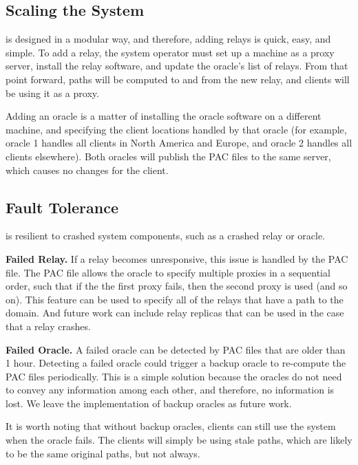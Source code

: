 \subsection{Scaling the System}
\system{} is 
designed in a modular way, and therefore, adding relays is quick, easy, and 
simple.  To add a relay, the system operator must set up a machine as a proxy 
server, install the \system{} relay software, and update the oracle's list of 
relays.  From that point forward, paths will be computed to and from the new 
relay, and clients will be using it as a proxy.  

Adding an oracle is a matter of installing the oracle software on 
a different machine, and specifying the client locations handled by that oracle 
(for example, oracle 1 handles all clients in North America and Europe, and 
oracle 2 handles all clients elsewhere).  Both oracles will publish the PAC files 
to the same server, which causes no changes for the client.

\subsection{Fault Tolerance}
\system{} is resilient to crashed system components, such as a crashed relay or 
oracle.  

{\bf Failed Relay.} If a relay becomes unresponsive, this issue is handled by 
the PAC file.  The PAC file allows the oracle to specify multiple proxies in 
a sequential order, such that if the the first proxy fails, then the second 
proxy is used (and so on).  This feature can be used to specify all of the 
relays that have a path to the domain.  And future work can include relay 
replicas that can be used in the case that a relay crashes.

{\bf Failed Oracle.} A failed oracle can be detected by PAC files that are 
older than 1 hour.  Detecting a failed oracle could trigger a backup oracle 
to re-compute the PAC files periodically.  This is a simple solution because 
the oracles do not need to convey any information among each other, and therefore, 
no information is lost.  We leave the implementation of backup oracles as future 
work.

It is worth noting that without backup oracles, clients can still use the system 
when the oracle fails.  The clients will simply be using stale paths, which are 
likely to be the same original paths, but not always.  


